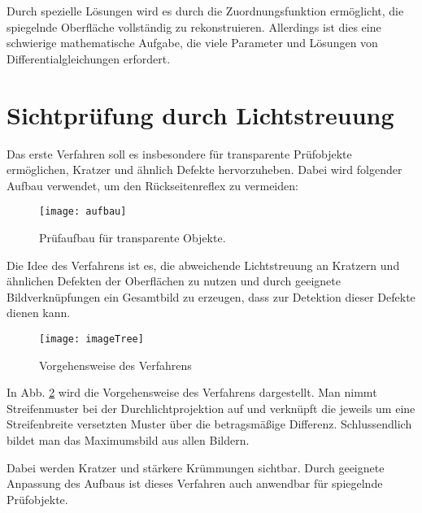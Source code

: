 \documentclass[ngerman,11pt,twocolumn,a4paper]{article}
\begin{document}
	Durch spezielle Lösungen wird es durch die Zuordnungsfunktion ermöglicht, die spiegelnde Oberfläche vollständig zu rekonstruieren.
	Allerdings ist dies eine schwierige mathematische Aufgabe, die viele Parameter und Lösungen von Differentialgleichungen erfordert.
	
	\section{Sichtprüfung durch Lichtstreuung} \label{sec:sichtpruefungDurchLichtstreuung}
	Das erste Verfahren soll es insbesondere für transparente Prüfobjekte ermöglichen, Kratzer und ähnlich Defekte hervorzuheben.
	Dabei wird folgender Aufbau verwendet, um den Rückseitenreflex zu vermeiden:
	\begin{figure}[H]
		\centering
		\texttt{[image: aufbau]}
		\caption{Prüfaufbau für transparente Objekte.}
		\label{img:aufbau}
	\end{figure}
	
	Die Idee des Verfahrens ist es, die abweichende Lichtstreuung an Kratzern und ähnlichen Defekten der Oberflächen zu nutzen und durch geeignete Bildverknüpfungen ein Gesamtbild zu erzeugen, dass zur Detektion dieser Defekte dienen kann.
	
	\begin{figure}[H]
		\centering
		\texttt{[image: imageTree]}
		\caption{Vorgehensweise des Verfahrens}
		\label{img:imageTree}
	\end{figure}
	
	In Abb. \ref{img:imageTree} wird die Vorgehensweise des Verfahrens dargestellt.
	Man nimmt Streifenmuster bei der Durchlichtprojektion auf und verknüpft die jeweils um eine Streifenbreite versetzten Muster über die betragsmäßige Differenz.
	Schlussendlich bildet man das Maximumsbild aus allen Bildern.
	
	\par
	Dabei werden Kratzer und stärkere Krümmungen sichtbar.
	Durch geeignete Anpassung des Aufbaus ist dieses Verfahren auch anwendbar für spiegelnde Prüfobjekte.
	
\end{document}
